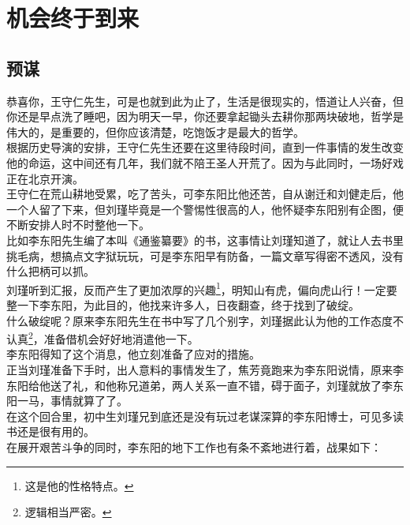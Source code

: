\section{机会终于到来}
\ifnum{}
	\begin{multicols}{\theparacolNo}
\fi
\subsection{预谋}
恭喜你，王守仁先生，可是也就到此为止了，生活是很现实的，悟道让人兴奋，但你还是早点洗了睡吧，因为明天一早，你还要拿起锄头去耕你那两块破地，哲学是伟大的，是重要的，但你应该清楚，吃饱饭才是最大的哲学。\\

根据历史导演的安排，王守仁先生还要在这里待段时间，直到一件事情的发生改变他的命运，这中间还有几年，我们就不陪王圣人开荒了。因为与此同时，一场好戏正在北京开演。\\

王守仁在荒山耕地受累，吃了苦头，可李东阳比他还苦，自从谢迁和刘健走后，他一个人留了下来，但刘瑾毕竟是一个警惕性很高的人，他怀疑李东阳别有企图，便不断安排人时不时整他一下。\\

比如李东阳先生编了本叫《通鉴纂要》的书，这事情让刘瑾知道了，就让人去书里挑毛病，想搞点文字狱玩玩，可是李东阳早有防备，一篇文章写得密不透风，没有什么把柄可以抓。\\

刘瑾听到汇报，反而产生了更加浓厚的兴趣\footnote{这是他的性格特点。}，明知山有虎，偏向虎山行！一定要整一下李东阳，为此目的，他找来许多人，日夜翻查，终于找到了破绽。\\

什么破绽呢？原来李东阳先生在书中写了几个别字，刘瑾据此认为他的工作态度不认真\footnote{逻辑相当严密。}，准备借机会好好地消遣他一下。\\

李东阳得知了这个消息，他立刻准备了应对的措施。\\

正当刘瑾准备下手时，出人意料的事情发生了，焦芳竟跑来为李东阳说情，原来李东阳给他送了礼，和他称兄道弟，两人关系一直不错，碍于面子，刘瑾就放了李东阳一马，事情就算了了。\\

在这个回合里，初中生刘瑾兄到底还是没有玩过老谋深算的李东阳博士，可见多读书还是很有用的。\\

在展开艰苦斗争的同时，李东阳的地下工作也有条不紊地进行着，战果如下：\\


\end{multicols}
